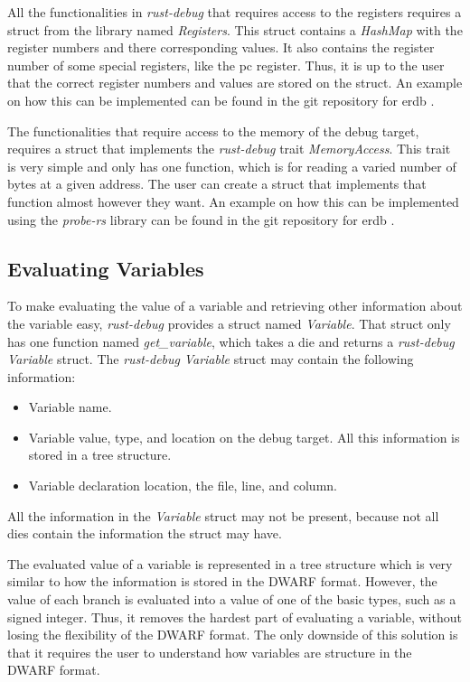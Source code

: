 All the functionalities in \emph{rust-debug} that requires access to the registers requires a struct from the library named \emph{Registers}.
This struct contains a \emph{HashMap} with the register numbers and there corresponding values.
It also contains the register number of some special registers, like the \acrshort{pc} register.
Thus, it is up to the user that the correct register numbers and values are stored on the struct.  
An example on how this can be implemented can be found in the git repository for \gls{erdb} \cite{erdb}.


The functionalities that require access to the memory of the debug target, requires a struct that implements the \emph{rust-debug} trait \emph{MemoryAccess}.
This trait is very simple and only has one function, which is for reading a varied number of bytes at a given address.
The user can create a struct that implements that function almost however they want.
An example on how this can be implemented using the \emph{probe-rs} library can be found in the git repository for \gls{erdb} \cite{erdb}.



\subsection{Evaluating Variables} \label{sec:ievalvar}
To make evaluating the value of a variable and retrieving other information about the variable easy, \emph{rust-debug} provides a struct named \emph{Variable}.
That struct only has one function named \emph{get\_variable}, which takes a \gls{die} and returns a \emph{rust-debug} \emph{Variable} struct.
The \emph{rust-debug} \emph{Variable} struct may contain the following information:


\begin{itemize}
  \item Variable name.
  \item Variable value, type, and location on the debug target. All this information is stored in a tree structure.
  \item Variable declaration location, the file, line, and column.
\end{itemize}


All the information in the \emph{Variable} struct may not be present, because not all \glspl{die} contain the information the struct may have.


The evaluated value of a variable is represented in a tree structure which is very similar to how the information is stored in the \gls{DWARF} format.
However, the value of each branch is evaluated into a value of one of the basic types, such as a signed integer.
Thus, it removes the hardest part of evaluating a variable, without losing the flexibility of the \gls{DWARF} format.
The only downside of this solution is that it requires the user to understand how variables are structure in the \gls{DWARF} format.


